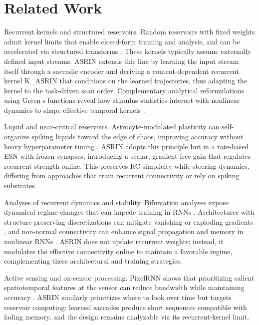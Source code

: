 \documentclass{article}
\begin{document}
\section{Related Work}
Recurrent kernels and structured reservoirs. Random reservoirs with fixed weights admit kernel limits that enable closed-form training and analysis, and can be accelerated via structured transforms \cite{dong-2020-reservoir}. These kernels typically assume externally defined input streams. ASRIN extends this line by learning the input stream itself through a saccadic encoder and deriving a content-dependent recurrent kernel K\_ASRIN that conditions on the learned trajectories, thus adapting the kernel to the task-driven scan order. Complementary analytical reformulations using Greens functions reveal how stimulus statistics interact with nonlinear dynamics to shape effective temporal kernels \cite{nestler-2020-unfolding}.

Liquid and near-critical reservoirs. Astrocyte-modulated plasticity can self-organize spiking liquids toward the edge of chaos, improving accuracy without heavy hyperparameter tuning \cite{ivanov-2021-increasing}. ASRIN adopts this principle but in a rate-based ESN with frozen synapses, introducing a scalar, gradient-free gain that regulates recurrent strength online. This preserves RC simplicity while steering dynamics, differing from approaches that train recurrent connectivity or rely on spiking substrates.

Analyses of recurrent dynamics and stability. Bifurcation analyses expose dynamical regime changes that can impede training in RNNs \cite{eisenmann-2023-bifurcations}. Architectures with structure-preserving discretizations can mitigate vanishing or exploding gradients \cite{rusch-2021-unicornn}, and non-normal connectivity can enhance signal propagation and memory in nonlinear RNNs \cite{orhan-2019-improved}. ASRIN does not update recurrent weights; instead, it modulates the effective connectivity online to maintain a favorable regime, complementing these architectural and training strategies.

Active sensing and on-sensor processing. PixelRNN shows that prioritizing salient spatiotemporal features at the sensor can reduce bandwidth while maintaining accuracy \cite{so-2023-pixelrnn}. ASRIN similarly prioritizes where to look over time but targets reservoir computing: learned saccades produce short sequences compatible with fading memory, and the design remains analyzable via its recurrent-kernel limit.
\end{document}
